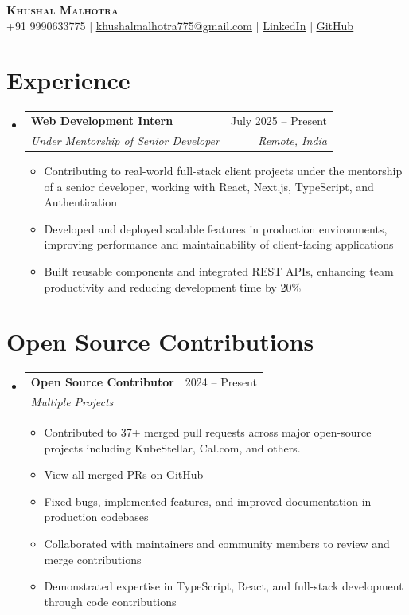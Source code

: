 \documentclass[letterpaper,11pt]{article}
\makeatletter
\newcommand{\resumeItem}[1]{
  \item\small{
    {#1 \vspace{-2pt}}
  }
}
\newcommand{\resumeSubheading}[4]{
  \vspace{-2pt}\item
    \begin{tabular*}{0.97\textwidth}[t]{l@{\extracolsep{\fill}}r}
      \textbf{#1} & #2 \\
      \textit{\small#3} & \textit{\small #4} \\
    \end{tabular*}\vspace{-7pt}
}
\newcommand{\resumeSubHeadingListStart}{\begin{itemize}[leftmargin=0.15in, label={}]}
\newcommand{\resumeSubHeadingListEnd}{\end{itemize}}
\newcommand{\resumeItemListStart}{\begin{itemize}}
\newcommand{\resumeItemListEnd}{\end{itemize}\vspace{-5pt}}
\makeatother
\begin{document}
\begin{center}
    \textbf{\Huge \scshape Khushal Malhotra} \\ \vspace{1pt}
    \small +91 9990633775 $|$ \href{mailto:khushalmalhotra775@gmail.com}{\underline{khushalmalhotra775@gmail.com}} $|$
    \href{https://www.linkedin.com/in/khushal-malhotra-643232207/}{\underline{LinkedIn}} $|$
    \href{https://github.com/khushal-winner}{\underline{GitHub}}
\end{center}


\section{Experience}
  \resumeSubHeadingListStart
\resumeSubheading
  {Web Development Intern}{July 2025 -- Present}
  {Under Mentorship of Senior Developer}{Remote, India}
  \resumeItemListStart
    \resumeItem{Contributing to real-world full-stack client projects under the mentorship of a senior developer, working with React, Next.js, TypeScript, and Authentication}
    \resumeItem{Developed and deployed scalable features in production environments, improving performance and maintainability of client-facing applications}
    \resumeItem{Built reusable components and integrated REST APIs, enhancing team productivity and reducing development time by 20\%}
  \resumeItemListEnd
  \resumeSubHeadingListEnd

\section{Open Source Contributions}
  \resumeSubHeadingListStart
\resumeSubheading
  {Open Source Contributor}{2024 -- Present}
  {Multiple Projects}{}
  \resumeItemListStart
    \resumeItem{Contributed to 37+ merged pull requests across major open-source projects including KubeStellar, Cal.com, and others.}
    \resumeItem{\href{https://github.com/search?q=author\%3Akhushal-winner+is\%3Apr+is\%3Amerged\&type=pullrequests}{View all merged PRs on GitHub}}
    \resumeItem{Fixed bugs, implemented features, and improved documentation in production codebases}
    \resumeItem{Collaborated with maintainers and community members to review and merge contributions}
    \resumeItem{Demonstrated expertise in TypeScript, React, and full-stack development through code contributions}
  \resumeItemListEnd
  \resumeSubHeadingListEnd
\end{document}
